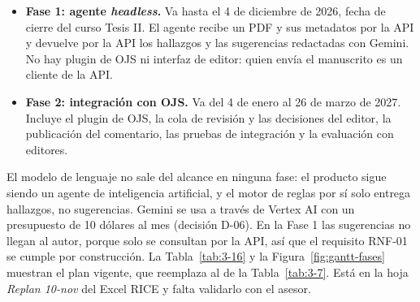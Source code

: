\begin{itemize}
  \item \textbf{Fase 1: agente \emph{headless}.} Va hasta el 4 de diciembre de 2026, fecha de cierre del curso Tesis II. El agente recibe un PDF y sus metadatos por la API y devuelve por la API los hallazgos y las sugerencias redactadas con Gemini. No hay plugin de OJS ni interfaz de editor: quien envía el manuscrito es un cliente de la API.
  \item \textbf{Fase 2: integración con OJS.} Va del 4 de enero al 26 de marzo de 2027. Incluye el plugin de OJS, la cola de revisión y las decisiones del editor, la publicación del comentario, las pruebas de integración y la evaluación con editores.
\end{itemize}

El modelo de lenguaje no sale del alcance en ninguna fase: el producto sigue siendo un agente de inteligencia artificial, y el motor de reglas por sí solo entrega hallazgos, no sugerencias. Gemini se usa a través de Vertex AI con un presupuesto de 10 dólares al mes (decisión D-06). En la Fase 1 las sugerencias no llegan al autor, porque solo se consultan por la API, así que el requisito RNF-01 se cumple por construcción. La Tabla~\ref{tab:3-16} y la Figura~\ref{fig:gantt-fases} muestran el plan vigente, que reemplaza al de la Tabla~\ref{tab:3-7}. Está en la hoja \emph{Replan 10-nov} del Excel RICE y falta validarlo con el asesor.

